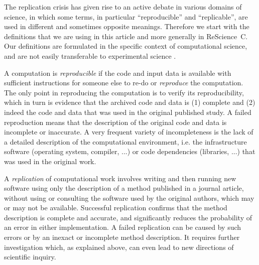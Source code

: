 \documentclass[runningheads]{llncs}
\begin{document}
The replication crisis has given rise to an active debate in various domains of science, in which some terms, in particular ``reproducible'' and ``replicable'', are used in different and sometimes opposite meanings. Therefore we start with the definitions that we are using in this article and more generally in ReScience~C. Our definitions are formulated in the specific context of computational science, and are not easily transferable to experimental science \cite{HinsenScientificsoftwaredifferent2018}.

A computation is \textit{reproducible} if the code and input data is available with sufficient instructions for someone else to re-do or \textit{reproduce} the computation. The only point in reproducing the computation is to verify its reproducibility, which in turn is evidence that the archived code and data is (1) complete and (2) indeed the code and data that was used in the original published study. A failed reproduction means that the description of the original code and data is incomplete or inaccurate. A very frequent variety of incompleteness is the lack of a detailed description of the computational environment, i.e. the infrastructure software (operating system, compiler, ...) or code dependencies (libraries, ...) that was used in the original work.

A \textit{replication} of computational work involves writing and then running new software using only the description of a method published in a journal article, without using or consulting the software used by the original authors, which may or may not be available. Successful replication confirms that the method description is complete and accurate, and significantly reduces the probability of an error in either implementation. A failed replication can be caused by such errors or by an inexact or incomplete method description. It requires further investigation which, as explained above, can even lead to new directions of scientific inquiry.

%
%


%
\end{document}
